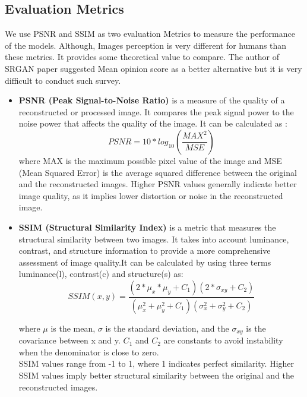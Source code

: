     \subsection{Evaluation Metrics}
    We use PSNR and SSIM as two evaluation Metrics to measure the performance of the models. Although, Images perception is very different for humans than these metrics. It provides some theoretical value to compare. The author of SRGAN paper suggested Mean opinion score as a better alternative but it is very difficult to conduct such survey.\\
    \begin{itemize}
        \item {\bf PSNR (Peak Signal-to-Noise Ratio)} is a measure of the quality of a reconstructed or processed image. It compares the peak signal power to the noise power that affects the quality of the image. It can be calculated as :
        \begin{equation}
            PSNR = 10*log_{10}(\frac{MAX^{2}}{MSE})
        \end{equation}
            where MAX is the maximum possible pixel value of the image and MSE (Mean Squared Error) is the average squared difference between the original and the reconstructed images. Higher PSNR values generally indicate better image quality, as it implies lower distortion or noise in the reconstructed image.\\
        \item { \bf SSIM (Structural Similarity Index)} is a metric that measures the structural similarity between two images. It takes into account luminance, contrast, and structure information to provide a more comprehensive assessment of image quality.It can be calculated by using three terms luminance(l), contrast(c) and structure(s) as:
        \begin{equation}
            SSIM(x,y)= \frac{(2*\mu _x*\mu _y+C_1)(2*\sigma_{xy}+C_2)}{(\mu_x^2+\mu_y^2+C_1)(\sigma_x^2+\sigma_y^2+C_2)}
        \end{equation}
        
        where $\mu$ is the mean, $\sigma$ is the standard deviation, and the $\sigma_{xy}$ is the covariance between x and y. $C_1$ and $C_2$ are constants to avoid instability when the denominator is close to zero. \\
        SSIM values range from -1 to 1, where 1 indicates perfect similarity. Higher SSIM values imply better structural similarity between the original and the reconstructed images.
    
    \end{itemize}
    
    